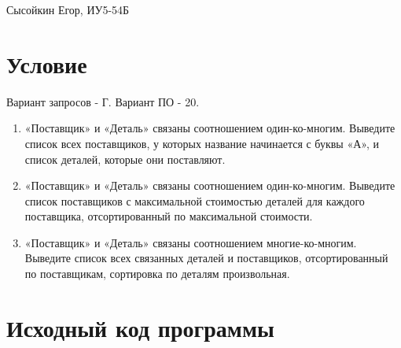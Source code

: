 \documentclass[a4paper]{report}
\begin{document}
	Сысойкин Егор, ИУ5-54Б
	\section*{Условие}
	Вариант запросов - Г.
	Вариант ПО - 20.
	\begin{enumerate}
    	\item «Поставщик» и «Деталь» связаны соотношением один-ко-многим. Выведите список всех поставщиков, у которых название начинается с буквы «А», и список деталей, которые они поставляют. \\
    	\item «Поставщик» и «Деталь» связаны соотношением один-ко-многим. Выведите список поставщиков с максимальной стоимостью деталей для каждого поставщика, отсортированный по максимальной стоимости. \\
    	\item «Поставщик» и «Деталь» связаны соотношением многие-ко-многим. Выведите список всех связанных деталей и поставщиков, отсортированный по поставщикам, сортировка по деталям произвольная. \\ 
	\end{enumerate}

	\section*{Исходный код программы}
\end{document}
